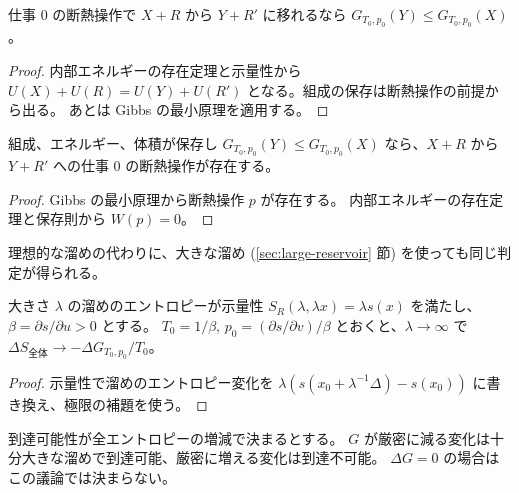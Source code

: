 \begin{theorem}
  \label{thm:gibbs-chain}
  \leanok
  仕事 $0$ の断熱操作で $X + R$ から $Y + R'$ に移れるなら $G_{T_0,p_0}(Y) \le G_{T_0,p_0}(X)$。
\end{theorem}

\begin{proof}
  \leanok
  内部エネルギーの存在定理と示量性から $U(X) + U(R) = U(Y) + U(R')$ となる。組成の保存は断熱操作の前提から出る。
  あとは Gibbs の最小原理を適用する。
\end{proof}

\begin{theorem}
  \label{thm:gibbs-chain-converse}
  \leanok
  組成、エネルギー、体積が保存し $G_{T_0,p_0}(Y) \le G_{T_0,p_0}(X)$ なら、$X + R$ から $Y + R'$ への仕事 $0$ の断熱操作が存在する。
\end{theorem}

\begin{proof}
  \leanok
  Gibbs の最小原理から断熱操作 $p$ が存在する。
  内部エネルギーの存在定理と保存則から $W(p) = 0$。
\end{proof}

理想的な溜めの代わりに、大きな溜め (\ref{sec:large-reservoir} 節) を使っても同じ判定が得られる。

\begin{theorem}
  \label{thm:gibbs-large}
  \leanok
  大きさ $\lambda$ の溜めのエントロピーが示量性 $S_R(\lambda, \lambda x) = \lambda s(x)$ を満たし、$\beta = \partial s/\partial u > 0$ とする。
  $T_0 = 1/\beta$, $p_0 = (\partial s/\partial v)/\beta$ とおくと、$\lambda \to \infty$ で $\Delta S_{\text{全体}} \to -\Delta G_{T_0,p_0} / T_0$。
\end{theorem}

\begin{proof}
  \leanok
  示量性で溜めのエントロピー変化を $\lambda(s(x_0 + \lambda^{-1}\Delta) - s(x_0))$ に書き換え、極限の補題を使う。
\end{proof}

\begin{corollary}[大きな溜めでの判定]
  \label{cor:gibbs-large}
  \leanok
  到達可能性が全エントロピーの増減で決まるとする。
  $G$ が厳密に減る変化は十分大きな溜めで到達可能、厳密に増える変化は到達不可能。
  $\Delta G = 0$ の場合はこの議論では決まらない。
\end{corollary}

